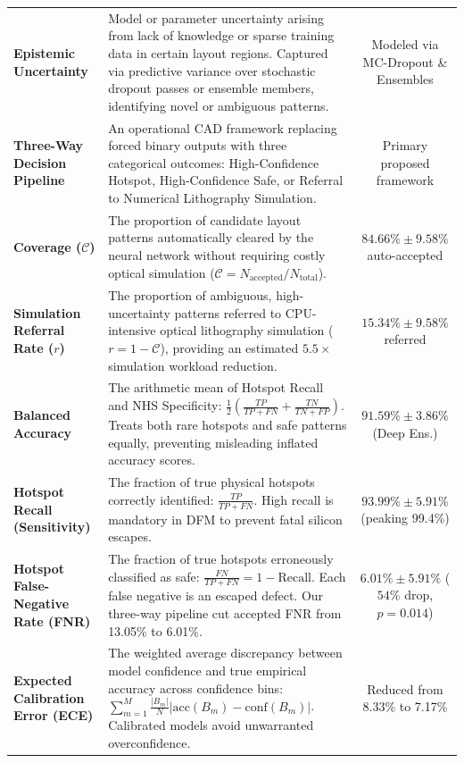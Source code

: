 \documentclass[11pt,journal,onecolumn]{IEEEtran}
\begin{document}
\begin{table}[htbp]
\begin{tabular}{p{4.2cm}p{9.8cm}c}
\addlinespace
\textbf{Epistemic Uncertainty} & Model or parameter uncertainty arising from lack of knowledge or sparse training data in certain layout regions. Captured via predictive variance over stochastic dropout passes or ensemble members, identifying novel or ambiguous patterns. & Modeled via MC-Dropout \& Ensembles \\
\addlinespace
\textbf{Three-Way Decision Pipeline} & An operational CAD framework replacing forced binary outputs with three categorical outcomes: High-Confidence Hotspot, High-Confidence Safe, or Referral to Numerical Lithography Simulation. & Primary proposed framework \\
\addlinespace
\textbf{Coverage ($\mathcal{C}$)} & The proportion of candidate layout patterns automatically cleared by the neural network without requiring costly optical simulation ($\mathcal{C} = N_{\text{accepted}} / N_{\text{total}}$). & $84.66\% \pm 9.58\%$ auto-accepted \\
\addlinespace
\textbf{Simulation Referral Rate ($r$)} & The proportion of ambiguous, high-uncertainty patterns referred to CPU-intensive optical lithography simulation ($r = 1 - \mathcal{C}$), providing an estimated $5.5\times$ simulation workload reduction. & $15.34\% \pm 9.58\%$ referred \\
\addlinespace
\textbf{Balanced Accuracy} & The arithmetic mean of Hotspot Recall and NHS Specificity: $\frac{1}{2}\left(\frac{TP}{TP+FN} + \frac{TN}{TN+FP}\right)$. Treats both rare hotspots and safe patterns equally, preventing misleading inflated accuracy scores. & $91.59\% \pm 3.86\%$ (Deep Ens.) \\
\addlinespace
\textbf{Hotspot Recall (Sensitivity)} & The fraction of true physical hotspots correctly identified: $\frac{TP}{TP+FN}$. High recall is mandatory in DFM to prevent fatal silicon escapes. & $93.99\% \pm 5.91\%$ (peaking 99.4\%) \\
\addlinespace
\textbf{Hotspot False-Negative Rate (FNR)} & The fraction of true hotspots erroneously classified as safe: $\frac{FN}{TP+FN} = 1 - \text{Recall}$. Each false negative is an escaped defect. Our three-way pipeline cut accepted FNR from 13.05\% to 6.01\%. & $6.01\% \pm 5.91\%$ ($54\%$ drop, $p=0.014$) \\
\addlinespace
\textbf{Expected Calibration Error (ECE)} & The weighted average discrepancy between model confidence and true empirical accuracy across confidence bins: $\sum_{m=1}^M \frac{|B_m|}{N} |\text{acc}(B_m) - \text{conf}(B_m)|$. Calibrated models avoid unwarranted overconfidence. & Reduced from 8.33\% to 7.17\% \\

\end{tabular}
\end{table}
\end{document}
